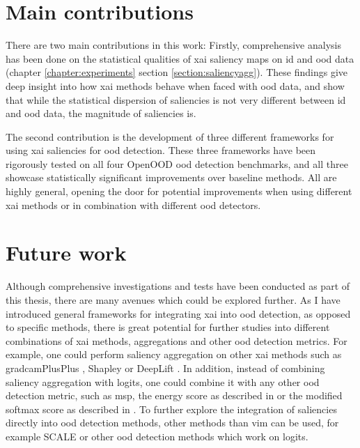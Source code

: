\documentclass[UKenglish]{uiomasterthesis} %
\theoremstyle{definition}
\begin{document}
\section{Main contributions}

There are two main contributions in this work: Firstly, comprehensive analysis has been done on the statistical qualities of \ac{xai} saliency maps on \ac{id} and \ac{ood} data (chapter \ref{chapter:experiments} section \ref{section:saliencyagg}). These findings give deep insight into how \ac{xai} methods behave when faced with \ac{ood} data, and show that while the statistical dispersion of saliencies is not very different between \ac{id} and \ac{ood} data, the magnitude of saliencies is.

The second contribution is the development of three different frameworks for using \ac{xai} saliencies for \ac{ood} detection. These three frameworks have been rigorously tested on all four OpenOOD \ac{ood} detection benchmarks, and all three showcase statistically significant improvements over baseline methods. All are highly general, opening the door for potential improvements when using different \ac{xai} methods or in combination with different \ac{ood} detectors.

\section{Future work} \label{section:future}

Although comprehensive investigations and tests have been conducted as part of this thesis, there are many avenues which could be explored further. As I have introduced general frameworks for integrating \ac{xai} into \ac{ood} detection, as opposed to specific methods, there is great potential for further studies into different combinations of \ac{xai} methods, aggregations and other \ac{ood} detection metrics. For example, one could perform saliency aggregation on other \ac{xai} methods such as \ac{gradcam}PlusPlus \cite{gradcamplusplus}, Shapley \cite{shapley} or DeepLift \cite{deeplift}. In addition, instead of combining saliency aggregation with logits, one could combine it with any other \ac{ood} detection metric, such as \ac{msp}, the energy score as described in \cite{energy} or the modified softmax score as described in \cite{odin}. To further explore the integration of saliencies directly into \ac{ood} detection methods, other methods than \ac{vim} can be used, for example SCALE \cite{scale} or other \ac{ood} detection methods which work on logits.
\end{document}
